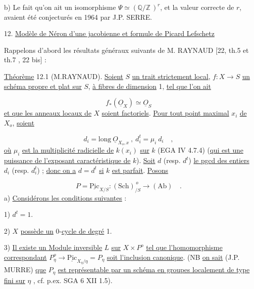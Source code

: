 b) Le fait qu'on ait un isomorphisme $\Psi \simeq (\mathbb{Q}/\mathbb{Z}\,)^r$, et la valeur correcte de $r$, avaient été conjecturés en 1964 par J.P. SERRE.




12. \underline{Modèle de Néron d'une jacobienne et formule de Picard Lefschetz}

Rappelons d'abord les résultats généraux suivants de M. RAYNAUD [22, th.5 et th.7 , 22 bis] :

\underline{Théorème} 12.1 (M.RAYNAUD). \underline{Soient} $S$ \underline{un trait strictement local}, $f:X \to S$ \underline{un schéma propre et plat sur} $S$, \underline{à fibres de dimension} 1, \underline{tel que l'on ait}

\begin{equation}\tag{12.1.1}
f_*(\underline{O}_X) \simeq \underline{O}_S
\end{equation}
\underline{et que les anneaux locaux de} $X$ \underline{soient factoriels}. \underline{Pour tout point maximal} $x_i$ \underline{de} $X_o$, \underline{soient}

\begin{equation}\tag{12.1.2}
d_i = \mathrm{long}\ \underline{O}_{X_o,x} \ , \ d_i^t = \mu_i \ d_i \quad ,
\end{equation}
\underline{où} $\mu_i$ \underline{est la multiplicité radicielle de} $k(x_i)$ \underline{sur} $k$ (EGA IV 4.7.4) (\underline{qui est une puissance de l'exposant caractéristique de} $k$). \underline{Soit} $d$ (resp. $d^t$) \underline{le pgcd des entiers} $d_i$ (resp. $d_i^t$) ; \underline{donc on a} $d = d^t$ \underline{si} $k$ \underline{est parfait}. \underline{Posons}

\begin{equation}\tag{12.1.3}
P = \underline{\mathrm{Pic}}_{X/S} : (\mathrm{Sch})_{/S}^{\,o} \longrightarrow (\mathrm{Ab}) \quad .
\end{equation}
a) \underline{Considérons les conditions suivantes} :

1) $d^t=1$.

2) $X$ \underline{possède un} $0$-\underline{cycle de degré} 1.

3) \underline{Il existe un Module inversible} $L$ \underline{sur} $X \times P^o$ \underline{tel que l'homomorphisme correspondant} $P^o_\eta \longrightarrow \underline{\mathrm{Pic}}_{X_\eta/\eta} = P_\eta$ \underline{soit l'inclusion canonique}. (NB \underline{on sait} (J.P. MURRE) \underline{que} $P_\eta$ \underline{est représentable par un schéma en groupes localement de type fini sur} $\eta$ , cf. p.ex. SGA 6 XII 1.5).



